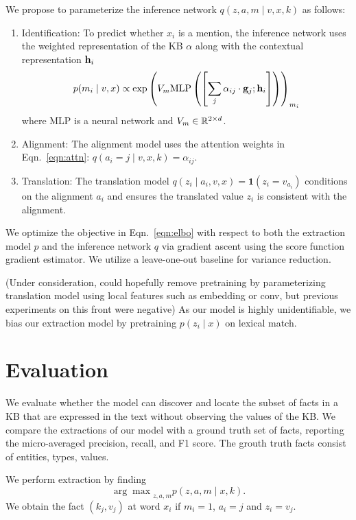 \documentclass[12pt]{article}
\begin{document}
We propose to parameterize the inference network $q(z,a,m\mid v,x,k)$ as follows:
\begin{enumerate}
\item Identification: To predict whether $x_i$ is a mention,
    the inference network uses the weighted representation of the KB $\alpha$
    along with the contextual representation $\mathbf{h}_i$
    \begin{equation}
    p(m_i \mid v,x) \propto
    \exp\left(V_m
    \textrm{MLP}\left(\left[\sum_j \alpha_{ij} \cdot \mathbf{g}_j; \mathbf{h}_i\right]\right)\right)_{m_i}
    \end{equation}
    where MLP is a neural network and $V_m \in \mathbb{R}^{2 \times d}$.
\item Alignment: The alignment model uses the attention weights in Eqn.~\ref{eqn:attn}:
    $q(a_i = j \mid v,x,k) = \alpha_{ij}$.
\item Translation: The translation model
    $q(z_i \mid a_i,v,x) = \mathbf{1}(z_i = v_{a_i})$
    conditions on the alignment $a_i$ and ensures the translated value $z_i$ is consistent
    with the alignment. 
\end{enumerate}

We optimize the objective in Eqn.~\ref{eqn:elbo}
with respect to both the extraction model $p$ and the inference network $q$
via gradient ascent using the score function gradient estimator.
We utilize a leave-one-out baseline for variance reduction.

(Under consideration, could hopefully remove pretraining by parameterizing translation
model using local features such as embedding or conv, but previous
experiments on this front were negative)
As our model is highly unidentifiable,
we bias our extraction model by pretraining $p(z_i \mid x)$ on lexical match.

\section{Evaluation}
We evaluate whether the model can discover
and locate the subset of facts in a KB that are expressed in the text
without observing the values of the KB.
We compare the extractions of our model with a ground truth set of facts,
reporting the micro-averaged precision, recall, and F1 score.
The grouth truth facts consist of entities, types, values.

We perform extraction by finding
$${\arg\max}_{z,a,m} p(z,a,m\mid x,k).$$
We obtain the fact $(k_j, v_j)$ at word $x_i$ if $m_i=1$,
$a_i = j$ and $z_i = v_j$.
\end{document}
